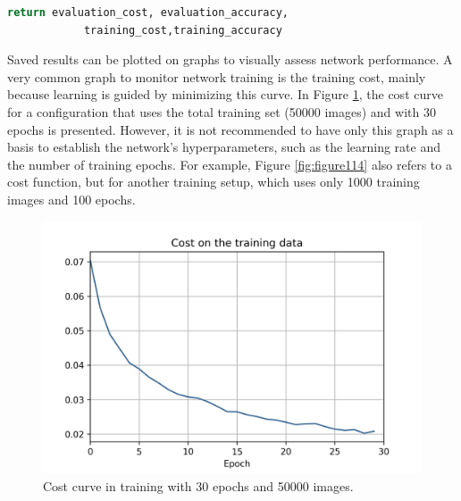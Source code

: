 \begin{lstlisting}[caption={Delta method in Python},label={lst:return},language=Python]
return evaluation_cost, evaluation_accuracy,
            training_cost,training_accuracy
\end{lstlisting}

Saved results can be plotted on graphs to visually assess network performance. A very common graph to monitor network training is the training cost, mainly because learning is guided by minimizing this curve. In Figure \ref{fig:figure113}, the cost curve for a configuration that uses the total training set (50000 images) and with 30 epochs is presented. However, it is not recommended to have only this graph as a basis to establish the network's hyperparameters, such as the learning rate and the number of training epochs. For example, Figure \ref{fig:figure114} also refers to a cost function, but for another training setup, which uses only 1000 training images and 100 epochs.

\begin{figure}
    \centering
    \includegraphics[scale=0.6]{"Part 3 - Learning Systems/Supervised Learning/Deep Learning/images/figure113.jpg"}
    \caption{Cost curve in training with 30 epochs and 50000 images.}
    \label{fig:figure113}
\end{figure}

